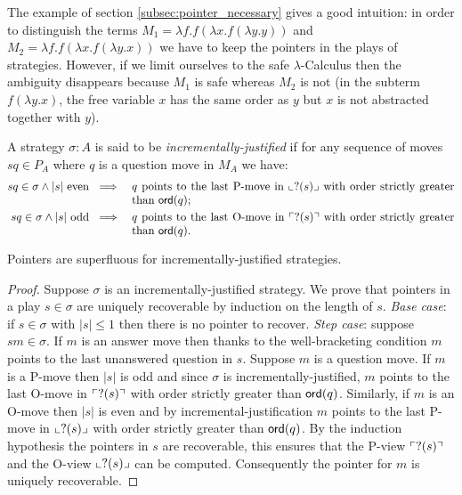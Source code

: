 The example of section \ref{subsec:pointer_necessary} gives a good
intuition: in order to distinguish the terms $M_1 = \lambda f . f
(\lambda x . f (\lambda y .y ))$ and $M_2 = \lambda f . f (\lambda x
. f (\lambda y .x ))$ we have to keep the pointers in the plays of
strategies. However, if we limit ourselves to the safe
$\lambda$-Calculus then the ambiguity disappears because $M_1$ is
safe whereas $M_2$ is not (in the subterm $f (\lambda y . x)$, the
free variable $x$ has the same order as $y$ but $x$ is not
abstracted together with $y$).

\begin{dfn}
A strategy $\sigma : A$ is said to be \emph{incrementally-justified}
if for any sequence of moves $s q \in P_A$ where $q$ is a question
move in $M_A$ we have:
\begin{eqnarray*}
s q \in \sigma \wedge |s| \mbox{ even } &\implies& \parbox[t]{10cm}{$q$ points to the last P-move in $\oview{?(s)}$ with order strictly greater than $\ord{q}$;} \\
s q \in \sigma \wedge |s| \mbox{ odd } &\implies&
\parbox[t]{10cm}{$q$  points to the last O-move in $\pview{?(s)}$
with order strictly greater than $\ord{q}$.}
\end{eqnarray*}
\end{dfn}

\begin{lem}
\label{lem:incrjustified_pointers_uniqu_recover} Pointers are
superfluous for incrementally-justified strategies.
\end{lem}
\begin{proof}
Suppose $\sigma$ is an incrementally-justified strategy. We prove
that pointers in a play $s\in \sigma$ are uniquely recoverable by
induction on the length of $s$. \noindent \emph{Base case}: if $s
\in \sigma$ with $|s| \leq 1$ then there is no pointer to recover.
\noindent \emph{Step case}: suppose $s m \in \sigma$. If $m$ is an
answer move then thanks to the well-bracketing condition $m$ points
to the last unanswered question in $s$. Suppose $m$ is a question
move. If $m$ is a P-move then $|s|$ is odd and since $\sigma$ is
incrementally-justified, $m$ points to the last O-move in
$\ulcorner ?(s) \urcorner$ with order strictly greater than ${\sf ord}(q)$.
Similarly, if $m$ is an O-move then $|s|$ is even and by
incremental-justification $m$ points to the last P-move in
$\llcorner ?(s) \lrcorner$ with order strictly greater than ${\sf ord}(q)$. By the
induction hypothesis the pointers in $s$ are recoverable, this
ensures that the P-view $\ulcorner ?(s) \urcorner$ and the O-view $\llcorner ?(s) \lrcorner$
can be computed. Consequently the pointer for $m$ is uniquely
recoverable.
\end{proof}

